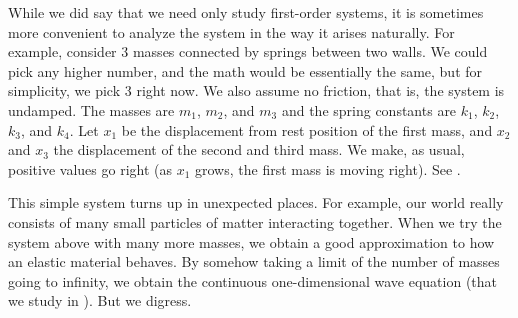 While we did say that we need only study first-order systems, it is
sometimes more convenient to analyze the system in the way it arises naturally.
For example, consider 3 masses connected by springs between two
walls.  We could pick any higher number, and the math would be essentially
the same, but for simplicity, we pick 3 right now.  We also assume no
friction, that is, the system is undamped.
The masses are $m_1$, $m_2$, and
$m_3$ and the spring constants are $k_1$, $k_2$, $k_3$, and $k_4$.
Let $x_1$ be the displacement from rest position of the first mass, and
$x_2$ and $x_3$ the displacement of the second and third mass.  We make,
as usual, positive values go right (as $x_1$ grows, the first mass is
moving right).
See .

\begin{myfig}
\capstart
{}
\caption{System of masses and springs.\label{sosa:threecartsfig}}
\end{myfig}

This simple system turns up in unexpected places.  For example, 
our world really consists of many small particles of matter interacting together.
When we try the system above with many more masses, we obtain a good approximation to
how an elastic material behaves.  By somehow taking a limit of
the number of masses going to infinity, we obtain the continuous
one-dimensional wave equation (that we study in ).
But we digress.

